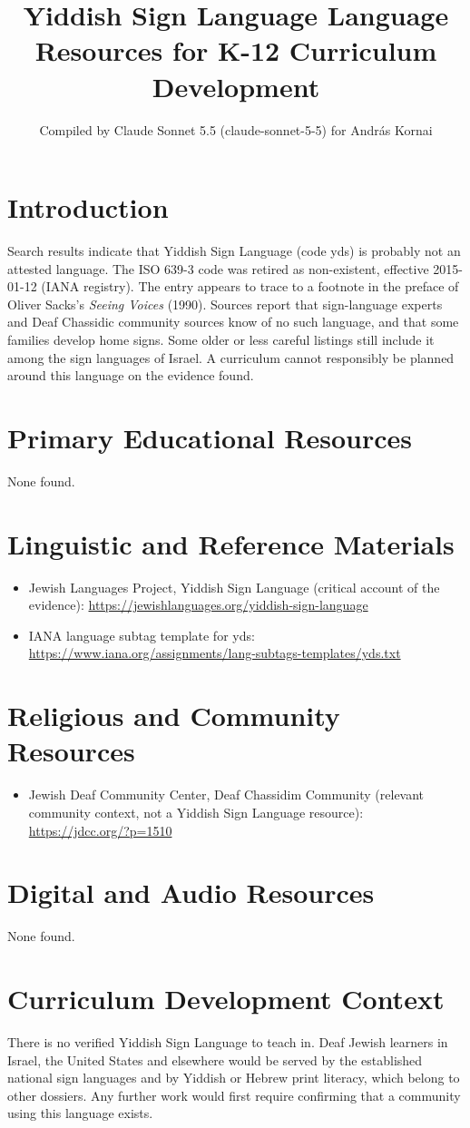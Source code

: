 \documentclass[12pt]{article}
\title{Yiddish Sign Language Language Resources for K-12 Curriculum Development}
\author{Compiled by Claude Sonnet 5.5 (claude-sonnet-5-5) for Andr\'as Kornai}
\date{}
\begin{document}
\maketitle

\section{Introduction}
Search results indicate that Yiddish Sign Language (code yds) is probably not an attested language. The ISO 639-3 code was retired as non-existent, effective 2015-01-12 (IANA registry). The entry appears to trace to a footnote in the preface of Oliver Sacks's \emph{Seeing Voices} (1990). Sources report that sign-language experts and Deaf Chassidic community sources know of no such language, and that some families develop home signs. Some older or less careful listings still include it among the sign languages of Israel. A curriculum cannot responsibly be planned around this language on the evidence found.

\section{Primary Educational Resources}
None found.

\section{Linguistic and Reference Materials}
\begin{itemize}
\item Jewish Languages Project, Yiddish Sign Language (critical account of the evidence): \url{https://jewishlanguages.org/yiddish-sign-language}
\item IANA language subtag template for yds: \url{https://www.iana.org/assignments/lang-subtags-templates/yds.txt}
\end{itemize}

\section{Religious and Community Resources}
\begin{itemize}
\item Jewish Deaf Community Center, Deaf Chassidim Community (relevant community context, not a Yiddish Sign Language resource): \url{https://jdcc.org/?p=1510}
\end{itemize}

\section{Digital and Audio Resources}
None found.

\section{Curriculum Development Context}
There is no verified Yiddish Sign Language to teach in. Deaf Jewish learners in Israel, the United States and elsewhere would be served by the established national sign languages and by Yiddish or Hebrew print literacy, which belong to other dossiers. Any further work would first require confirming that a community using this language exists.
\end{document}
